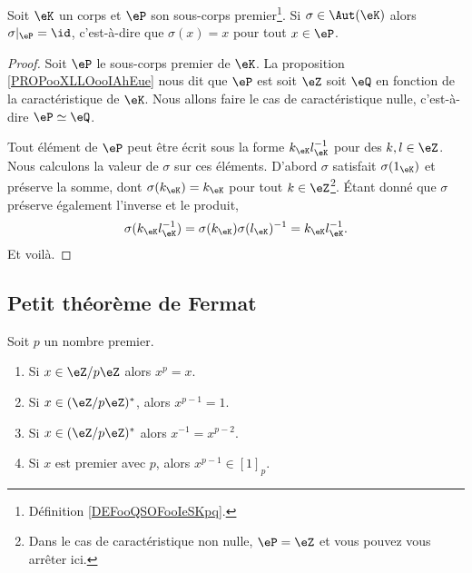 \begin{proposition}     \label{PropqPPrgJ}
	Soit \( \eK\) un corps et \( \eP\) son sous-corps premier\footnote{Définition \ref{DEFooQSOFooIeSKpq}.}. Si \( \sigma\in\Aut(\eK)\) alors \( \sigma|_{\eP}=\id\), c'est-à-dire que \( \sigma(x)=x\) pour tout \( x\in \eP\).
\end{proposition}

\begin{proof}
	Soit \( \eP\) le sous-corps premier de \( \eK\). La proposition \ref{PROPooXLLOooIAhEue} nous dit que \( \eP\) est soit \( \eZ\) soit \( \eQ\) en fonction de la caractéristique de \( \eK\). Nous allons faire le cas de caractéristique nulle, c'est-à-dire \( \eP\simeq \eQ\).

	Tout élément de \( \eP\) peut être écrit sous la forme \( k_{\eK}l_{\eK}^{-1}\) pour des \( k,l\in \eZ\). Nous calculons la valeur de \( \sigma\) sur ces éléments. D'abord \( \sigma\) satisfait \( \sigma(1_{\eK})\) et préserve la somme, dont \( \sigma(k_{\eK})=k_{\eK}\) pour tout \( k\in \eZ\)\footnote{Dans le cas de caractéristique non nulle, \( \eP=\eZ\) et vous pouvez vous arrêter ici.}. Étant donné que \( \sigma\) préserve également l'inverse et le produit,
	\begin{equation}
		\sigma(k_{\eK}l_{\eK}^{-1})=\sigma(k_{\eK})\sigma(l_{\eK})^{-1}=k_{\eK}l_{\eK}^{-1}.
	\end{equation}
	Et voilà.
\end{proof}

\subsection{Petit théorème de Fermat}

\begin{theorem}       \label{ThoOPQOiO}
	Soit \( p\) un nombre premier.
	\begin{enumerate}
		\item
		      Si \( x\in \eZ/p\eZ\) alors \( x^p=x\).
		\item
		      Si \( x\in(\eZ/p\eZ)^*\), alors \( x^{p-1}=1\).
		\item
		      Si \( x\in (\eZ/p\eZ)^*\) alors \( x^{-1}=x^{p-2}\).
		\item       \label{ITEMooRNIVooOIzqgc}
		      Si \( x\) est premier avec \( p\), alors \( x^{p-1}\in [1]_p\).
	\end{enumerate}
\end{theorem}

